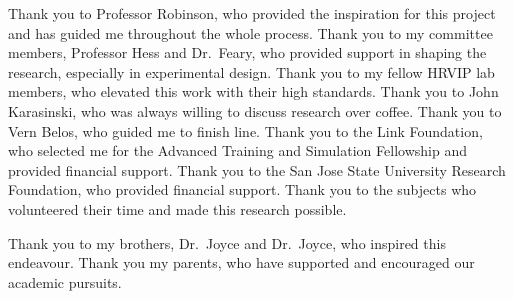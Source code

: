 \begin{frontmatter}
\maketitle





\tableofcontents
\listoffigures
\listoftables

    \newpage
    \begin{inlineabstract}
		\myabstract
    \end{inlineabstract}

\begin{acknowledgments}
    Thank you to Professor Robinson, who provided the inspiration for this project and has guided me throughout the whole process.
    Thank you to my committee members, Professor Hess and Dr.\ Feary, who provided support in shaping the research, especially in experimental design.
    Thank you to my fellow HRVIP lab members, who elevated this work with their high standards.
    Thank you to John Karasinski, who was always willing to discuss research over coffee.
    Thank you to Vern Belos, who guided me to finish line.
    Thank you to the Link Foundation, who selected me for the Advanced Training and Simulation Fellowship and provided financial support.
    Thank you to the San Jose State University Research Foundation, who provided financial support.
    Thank you to the subjects who volunteered their time and made this research possible.

    Thank you to my brothers, Dr.\ Joyce and Dr.\ Joyce, who inspired this endeavour. Thank you my parents, who have supported and encouraged our academic pursuits.


\end{acknowledgments}
\end{frontmatter}
